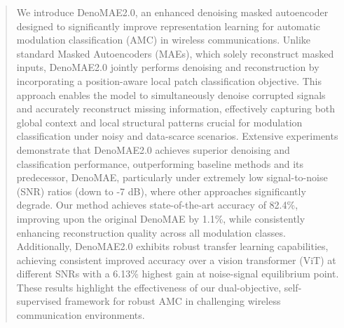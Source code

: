 \documentclass[journal]{IEEEtran}
\begin{document}
\begin{abstract}


We introduce DenoMAE2.0, an enhanced denoising masked autoencoder designed to significantly improve representation learning for automatic modulation classification (AMC) in wireless communications. Unlike standard Masked Autoencoders (MAEs), which solely reconstruct masked inputs, DenoMAE2.0 jointly performs denoising and reconstruction by incorporating a position-aware local patch classification objective. This approach enables the model to simultaneously denoise corrupted signals and accurately reconstruct missing information, effectively capturing both global context and local structural patterns crucial for modulation classification under noisy and data-scarce scenarios. Extensive experiments demonstrate that DenoMAE2.0 achieves superior denoising and classification performance, outperforming baseline methods and its predecessor, DenoMAE, particularly under extremely low signal-to-noise (SNR) ratios (down to -7 dB), where other approaches significantly degrade. Our method achieves state-of-the-art accuracy of 82.4\%, improving upon the original DenoMAE by 1.1\%, while consistently enhancing reconstruction quality across all modulation classes. Additionally, DenoMAE2.0 exhibits robust transfer learning capabilities, achieving consistent improved accuracy over a vision transformer (ViT) at different SNRs with a 6.13\% highest gain at noise-signal equilibrium point. These results highlight the effectiveness of our dual-objective, self-supervised framework for robust AMC in challenging wireless communication environments.


\end{abstract}











\end{document}
